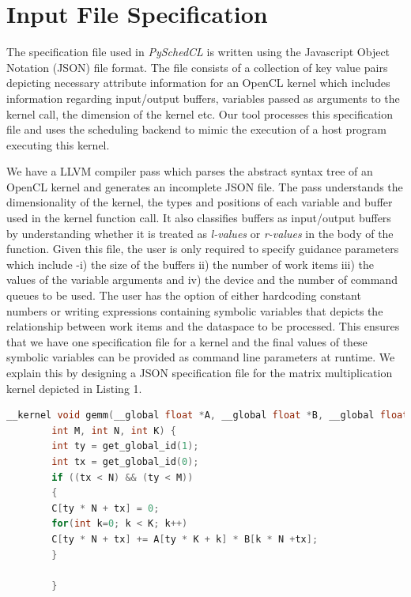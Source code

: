     \section{Input File Specification}
	The specification file used in {\em PySchedCL} is written using the Javascript Object Notation (JSON) file format. The file consists of a collection of key value pairs depicting  necessary attribute information for an OpenCL kernel which includes information regarding input/output buffers, variables passed as arguments to the kernel call, the dimension of the kernel etc. Our tool processes this specification file and uses the scheduling backend to mimic the execution of a host program executing this kernel. 
	\par We have a LLVM compiler pass which parses the abstract syntax tree of an OpenCL kernel and generates an incomplete JSON file. The pass understands the dimensionality of the kernel, the types and positions of each variable and buffer used in the kernel function call. It also classifies buffers as input/output buffers by understanding whether it is treated as \textit{l-values} or \textit{r-values} in the body of the function. Given this file, the user is only required to specify guidance parameters which include -i) the size of the buffers ii) the number of work items iii) the values of the variable arguments and iv) the device and the number of command queues to be used. The user has the option of either hardcoding constant numbers or writing expressions containing symbolic variables that depicts the relationship between work items and the dataspace to be processed. This ensures that we have one specification file for a kernel and the final values of these symbolic variables can be provided as command line parameters at runtime. We explain this by designing a JSON specification file for the matrix multiplication kernel depicted in Listing 1.

    \begin{lstlisting}[caption={OpenCL Kernel for Matrix Multiplication},captionpos=b,frame=single,basicstyle=\tiny,language=C]
        __kernel void gemm(__global float *A, __global float *B, __global float *C, 
        int M, int N, int K) {
        int ty = get_global_id(1);
        int tx = get_global_id(0);
        if ((tx < N) && (ty < M))
        {
        C[ty * N + tx] = 0;
        for(int k=0; k < K; k++)
        C[ty * N + tx] += A[ty * K + k] * B[k * N +tx];
        }
        
        }
    \end{lstlisting}


